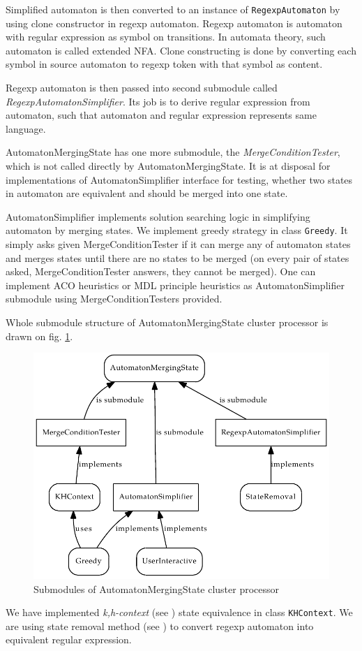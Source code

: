 \documentclass[a4paper,10pt,oneside]{article}
\newcommand{\myscale}{0.74}
\newcommand{\code}[1]{\texttt{#1}}
\newcommand{\jmodule}[1]{\emph{#1}}
\begin{document}
Simplified automaton is then converted to an instance of \code{RegexpAutomaton} by using clone constructor in regexp automaton.
Regexp automaton is automaton with regular expression as symbol on transitions.
In automata theory, such automaton is called extended NFA.
Clone constructing is done by converting each symbol in source automaton to regexp token with that symbol as content.

Regexp automaton is then passed into second submodule called \jmodule{RegexpAutomatonSimplifier}.
Its job is to derive regular expression from automaton, such that automaton and regular expression represents same language.

AutomatonMergingState has one more submodule, the \jmodule{MergeConditionTester}, which is not called directly by AutomatonMergingState.
It is at disposal for implementations of AutomatonSimplifier interface for testing, whether two states in automaton are equivalent and should be merged into one state.

AutomatonSimplifier implements solution searching logic in simplifying automaton by merging states.
We implement greedy strategy in class \code{Greedy}.
It simply asks given MergeConditionTester if it can merge any of automaton states and merges states until there are no states to be merged (on every pair of states asked, MergeConditionTester answers, they cannot be merged).
One can implement ACO heuristics or MDL principle heuristics as AutomatonSimplifier submodule using MergeConditionTesters provided.

Whole submodule structure of AutomatonMergingState cluster processor is drawn on fig. \ref{automaton_merging_state_submodules}.
\begin{figure}
	\centering\includegraphics[scale=\myscale]{automaton_merging_state_submodules}
	\caption{Submodules of AutomatonMergingState cluster processor} \label{automaton_merging_state_submodules}
\end{figure}
We have implemented \emph{k,h-context} (see \cite{ahonen}) state equivalence in class \code{KHContext}.
We are using state removal method (see \cite{1224321}) to convert regexp automaton into equivalent regular expression.
\end{document}
